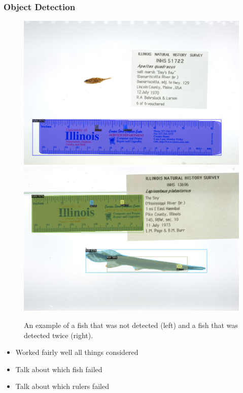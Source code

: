 \documentclass[conference]{IEEEtran}
\begin{document}
\subsubsection{Object Detection}
\begin{figure}[H]
  \centering
  \includegraphics[width=0.49\linewidth]{images/none1}
  \includegraphics[width=0.49\linewidth]{images/double1}
  \caption{An example of a fish that was not detected (left) and a fish that was detected twice (right).}
\end{figure}

\begin{itemize}
    \item Worked fairly well all things considered
    \item Talk about which fish failed
    \item Talk about which rulers failed
\end{itemize}
\end{document}
